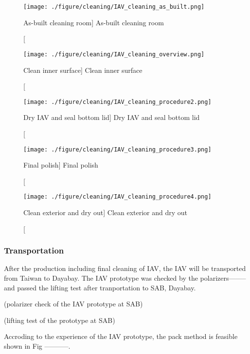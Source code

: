 \begin{figure}
    \centering
    \texttt{[image: ./figure/cleaning/IAV\_cleaning\_as\_built.png]}
    \caption
    [As-built cleaning room]
    {As-built cleaning room}
    \label{fig:IAV_cleaning_as_built.png}
    \end{figure}

\begin{figure}
    \centering
    \texttt{[image: ./figure/cleaning/IAV\_cleaning\_overview.png]}
    \caption
    [Clean inner surface]
    {Clean inner surface}
    \label{fig:IAV_cleaning_overview.png}
    \end{figure}

\begin{figure}
    \centering
    \texttt{[image: ./figure/cleaning/IAV\_cleaning\_procedure2.png]}
    \caption
    [Dry IAV and seal bottom lid]
    {Dry IAV and seal bottom lid}
    \label{fig:IAV_cleaning_procedure2.png}
    \end{figure}

\begin{figure}
    \centering
    \texttt{[image: ./figure/cleaning/IAV\_cleaning\_procedure3.png]}
    \caption
    [Final polish]
    {Final polish}
    \label{fig:IAV_cleaning_procedure3.png}
    \end{figure}

\begin{figure}
    \centering
    \texttt{[image: ./figure/cleaning/IAV\_cleaning\_procedure4.png]}
    \caption
    [Clean exterior and dry out]
    {Clean exterior and dry out}
    \label{fig:IAV_cleaning_procedure4.png}
    \end{figure}


\subsubsection {Transportation}

After the production including final cleaning of IAV, the IAV will be
transported from Taiwan to Dayabay.
The IAV prototype was checked by the polarizers-------- and passed
the lifting test after tranportation to SAB, Dayabay.


(polarizer check of the IAV prototype at SAB)




(lifting test of the prototype at SAB)


Accroding to the experience of the IAV
prototype, the pack method is feasible shown in Fig -----------.


